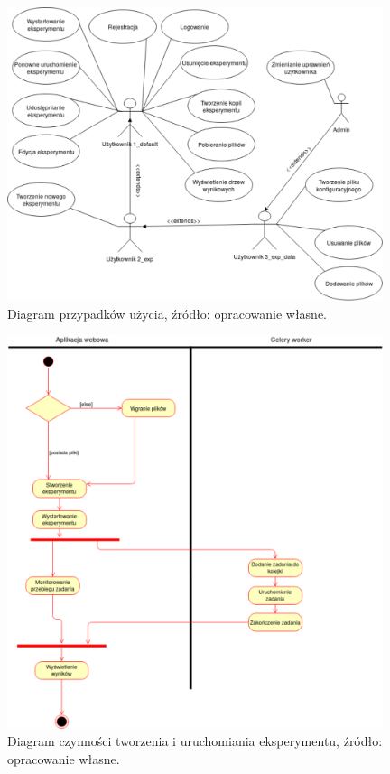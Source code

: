 \begin{figure}[htb]
\centering
\includegraphics[width=11cm]{grafika/diagram_przypadkow_uzycia.eps}
\caption{Diagram przypadków użycia, źródło: opracowanie własne.}
\label{rys1_diagram_przypadkow}
\end{figure}

\begin{figure}[htb]
	\centering
	\includegraphics[width=11cm]{grafika/diagram_przebiegu_tworzenia_eksperymentu.eps}
	\caption{Diagram czynności tworzenia i uruchomiania eksperymentu, źródło: opracowanie własne.}
	\label{rys2_diagram_czynności}
\end{figure}

